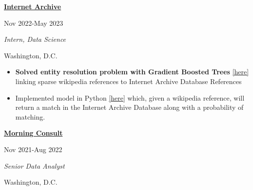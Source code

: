 \documentclass[
  16,
]{article}
\providecommand{\tightlist}{%
  \setlength{\itemsep}{0pt}\setlength{\parskip}{0pt}}\usepackage{longtable,booktabs,array}
\begin{document}
\begin{large}
  \begin{multicols}{2}
    \begin{flushleft}{\bf \href{https://archive.org/}{Internet Archive}}\end{flushleft}
    \begin{flushright}Nov 2022-May 2023\end{flushright}
  \end{multicols}
  \vspace{-0.17cm}
  \begin{multicols}{2}
    \begin{flushleft}\textit{Intern, Data Science}\end
    {flushleft}\begin{flushright}Washington, D.C.\end
    {flushright}
  \end{multicols}
\end{large}
\vspace{-0.16cm}

\begin{itemize}
\tightlist
\item
  \textbf{Solved entity resolution problem with Gradient Boosted Trees}
  \href{https://alexbass.me/projects/internet_archive/}{[here]} linking
  sparse wikipedia references to Internet Archive Database References
\item
  Implemented model in Python
  \href{https://github.com/acbass49/wiki2ia}{[here]} which, given a
  wikipedia reference, will return a match in the Internet Archive
  Database along with a probability of matching.
\end{itemize}

\vspace{7pt}

\begin{large}
  \begin{multicols}{2}
    \begin{flushleft}{\bf \href{https://morningconsult.com/}{Morning Consult}}\end{flushleft}
    \begin{flushright}Nov 2021-Aug 2022\end{flushright}
  \end{multicols}
  \vspace{-0.17cm}
  \begin{multicols}{2}
    \begin{flushleft}\textit{Senior Data Analyst}\end
    {flushleft}\begin{flushright}Washington, D.C.\end
    {flushright}
  \end{multicols}
\end{large}
\vspace{-0.16cm}
\end{document}
